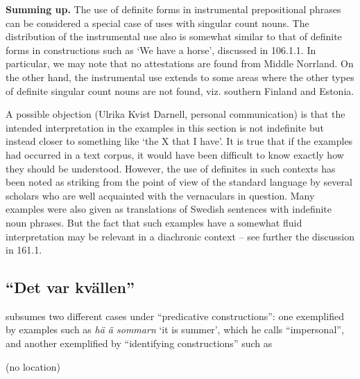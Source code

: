\begin{styleBodytextC}
\textbf{Summing up.} The use of definite forms in instrumental prepositional phrases can be considered a special case of uses with singular count nouns. The distribution of the instrumental use also is somewhat similar to that of definite forms in constructions such as ‘We have a horse’, discussed in 106.1.1. In particular, we may note that no attestations are found from Middle Norrland. On the other hand, the instrumental use extends to some areas where the other types of definite singular count nouns are not found, viz. southern Finland and Estonia. 

\end{styleBodytextC}

\begin{styleBodytextC}
A possible objection (Ulrika Kvist Darnell, personal communication) is that the intended interpretation in the examples in this section is not indefinite but instead closer to something like ‘the X that I have’. It is true that if the examples had occurred in a text corpus, it would have been difficult to know exactly how they should be understood. However, the use of definites in such contexts has been noted as striking from the point of view of the standard language by several scholars who are well acquainted with the vernaculars in question. Many examples were also given as translations of Swedish sentences with indefinite noun phrases. But the fact that such examples have a somewhat fluid interpretation may be relevant in a diachronic context – see further the discussion in 161.1. 

\end{styleBodytextC}

\subsection{ “Det var kvällen”}
\label{bkm:Ref224379336}
\begin{styleBodyTextFirst}
\citet[16]{Delsing2003a} subsumes two different cases under “predicative constructions”: one exemplified by examples such as \textit{hä ä sommarn} ‘it is summer’, which he calls “impersonal”, and another exemplified by “identifying constructions” such as 

\end{styleBodyTextFirst}

\begin{listWWNumileveli}
\item 

\begin{styleExample}
\label{bkm:Ref224115132}(no location)

\end{styleExample}

\end{listWWNumileveli}

